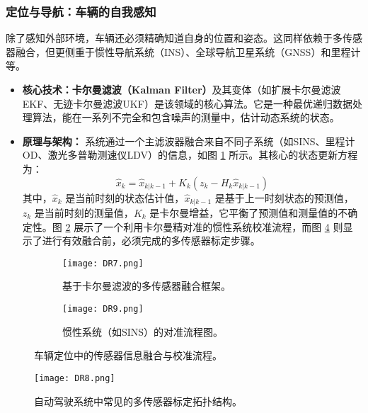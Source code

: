 \begin{itemize}
    \subsubsection{定位与导航：车辆的自我感知}
    除了感知外部环境，车辆还必须精确知道自身的位置和姿态。这同样依赖于多传感器融合，但更侧重于惯性导航系统（INS）、全球导航卫星系统（GNSS）和里程计等。
    \begin{itemize}
        \item \textbf{核心技术：卡尔曼滤波（Kalman Filter）}及其变体（如扩展卡尔曼滤波EKF、无迹卡尔曼滤波UKF）是该领域的核心算法。它是一种最优递归数据处理算法，能在一系列不完全和包含噪声的测量中，估计动态系统的状态。
        \item \textbf{原理与架构：} 系统通过一个主滤波器融合来自不同子系统（如SINS、里程计OD、激光多普勒测速仪LDV）的信息，如图 \ref{fig:kalman_filter_fusion_framework} 所示。其核心的状态更新方程为：
        $$
        \hat{x}_k = \hat{x}_{k|k-1} + K_k (z_k - H_k \hat{x}_{k|k-1})
        $$
        其中，$\hat{x}_k$ 是当前时刻的状态估计值，$\hat{x}_{k|k-1}$ 是基于上一时刻状态的预测值，$z_k$ 是当前时刻的测量值，$K_k$ 是卡尔曼增益，它平衡了预测值和测量值的不确定性。图 \ref{fig:inertial_system_alignment_flowchart} 展示了一个利用卡尔曼精对准的惯性系统校准流程，而图 \ref{fig:sensor_calibration_topologies} 则显示了进行有效融合前，必须完成的多传感器标定步骤。
    \end{itemize}

    \begin{figure}[htbp]
        \centering
        \begin{subfigure}[b]{0.48\textwidth}
            \centering
            \texttt{[image: DR7.png]}
            \caption{基于卡尔曼滤波的多传感器融合框架。}
            \label{fig:kalman_filter_fusion_framework}
        \end{subfigure}
        \hfill
        \begin{subfigure}[b]{0.48\textwidth}
            \centering
            \texttt{[image: DR9.png]}
            \caption{惯性系统（如SINS）的对准流程图。}
            \label{fig:inertial_system_alignment_flowchart}
        \end{subfigure}
        \caption{车辆定位中的传感器信息融合与校准流程。}
        \label{fig:localization_fusion_calibration}
    \end{figure}
    
    \begin{figure}[htbp]
        \centering
        \texttt{[image: DR8.png]}
        \caption{自动驾驶系统中常见的多传感器标定拓扑结构。}
        \label{fig:sensor_calibration_topologies}
    \end{figure}
    

\end{itemize}
